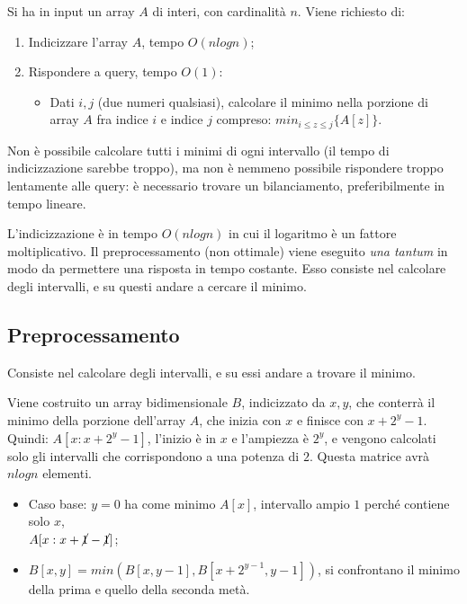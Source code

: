 Si ha in input un array $A$ di interi, con cardinalità $n$.
Viene richiesto di: 
\begin{enumerate}
    \item Indicizzare l'array $A$, tempo $O(nlogn)$;
    \item Rispondere a query, tempo $O(1)$:
    \begin{itemize}
        \item Dati $i, j$ (due numeri qualsiasi), calcolare il minimo nella porzione di array $A$ fra indice $i$ e indice $j$ compreso: $min_{i \leq z \leq j} \{A[z]\}$.
    \end{itemize}
\end{enumerate}

Non è possibile calcolare tutti i minimi di ogni intervallo (il tempo di indicizzazione sarebbe troppo), ma non è nemmeno possibile rispondere troppo lentamente alle query: è necessario trovare un bilanciamento, preferibilmente in tempo lineare. 

L'indicizzazione è in tempo $O(nlogn)$ in cui il logaritmo è un fattore moltiplicativo. Il preprocessamento (non ottimale) viene eseguito \textit{una tantum} in modo da permettere una risposta in tempo costante. Esso consiste nel calcolare degli intervalli, e su questi  andare a cercare il minimo.

\subsection{Preprocessamento}
Consiste nel calcolare degli intervalli, e su essi andare a trovare il minimo.

Viene costruito un array bidimensionale $B$, indicizzato da $x, y$, che conterrà il minimo della porzione dell'array $A$, che inizia con $x$ e finisce con $x + 2^y - 1$. \\
Quindi: $A[x: x + 2^y - 1]$, l'inizio è in $x$ e l'ampiezza è $2^y$, e vengono calcolati solo gli intervalli che corrispondono a una potenza di $2$. Questa matrice avrà $nlogn$ elementi.

\begin{itemize}
    \item Caso base: $y = 0$ ha come minimo $A[x]$, intervallo ampio $1$ perché contiene solo $x$, \\
    $A[x : x + \cancel{1} - \cancel{1}]$;
    \item $B[x, y] = min(B[x, y - 1], B[x + 2^{y - 1}, y - 1])$, si confrontano il minimo della prima e quello della seconda metà.
\end{itemize}

